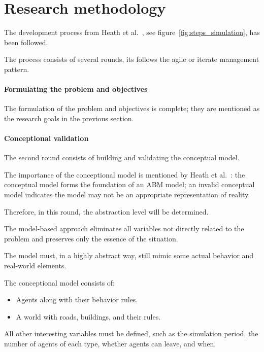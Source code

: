 \section{Research methodology}
The development process from Heath et al.~\cite{heath2009survey}, see figure~\ref{fig:steps_simulation},  has been followed.

The process consists of several rounds, its follows the agile or iterate management pattern.

\paragraph{Formulating the problem and objectives}

The formulation of the problem and objectives is complete; they are mentioned as the research goals in the previous section.

\paragraph{Conceptional validation}

The second round consists of building and validating the conceptual model.


The importance of the conceptional model is mentioned by Heath et al.~\cite{heath2009survey}: the conceptual model forms the foundation of an ABM model; an invalid conceptual model indicates the model may not be an appropriate representation of reality.

Therefore, in this round, the abstraction level will be determined.

The model-based approach eliminates all variables not directly related to the problem and preserves only the essence of the situation.

The model must, in a highly abstract way, still mimic some actual behavior and real-world elements.

The conceptional model consists of:

\begin{itemize}
    \item Agents along with their behavior rules.
    \item A world with roads, buildings, and their rules.
\end{itemize}


All other interesting variables must be defined, such as the simulation period, the number of agents of each type, whether agents can leave, and when.

